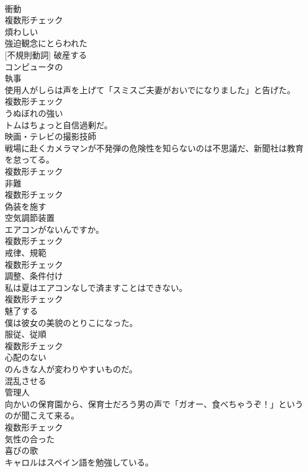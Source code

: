 \documentclass[8pt]{extreport}
\begin{document}
\begin{CJK}{UTF8}{min}
\\	[名詞]	衝動	
\\	複数形チェック
\\	[形容詞]	煩わしい	
\\	[形容詞]	強迫観念にとらわれた	
\\	[動詞] [不規則動詞]	破産する	
\\	[形容詞]	コンピュータの	
\\	[名詞]	執事	
\\	使用人がしらは声を上げて「スミスご夫妻がおいでになりました」と告げた。	
\\	複数形チェック
\\	[形容詞]	うぬぼれの強い	
\\	トムはちょっと自信過剰だ。	
\\	[名詞]	映画・テレビの撮影技師	
\\	戦場に赴くカメラマンが不発弾の危険性を知らないのは不思議だ、新聞社は教育を怠ってる。	
\\	複数形チェック
\\	[名詞]	非難	
\\	複数形チェック
\\	[動詞]	偽装を施す	
\\	[名詞]	空気調節装置	
\\	エアコンがないんですか。	
\\	複数形チェック
\\	[名詞]	戒律、規範	
\\	複数形チェック
\\	[名詞]	調整、条件付け	
\\	私は夏はエアコンなしで済ますことはできない。	
\\	複数形チェック
\\	[動詞]	魅了する	
\\	僕は彼女の美貌のとりこになった。	
\\	[名詞]	服従、従順	
\\	複数形チェック
\\	[形容詞]	心配のない	
\\	のんきな人が変わりやすいものだ。	
\\	[動詞]	混乱させる	
\\	[名詞]	管理人	
\\	向かいの保育園から、保育士だろう男の声で「ガオー、食べちゃうぞ！」というのが聞こえて来る。	
\\	複数形チェック
\\	[形容詞]	気性の合った	
\\	[名詞]	喜びの歌	
\\	キャロルはスペイン語を勉強している。	

\end{CJK}
\end{document}
